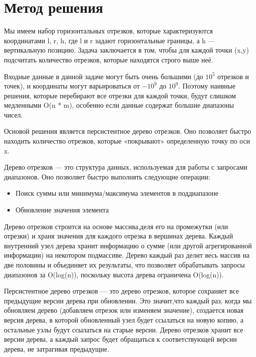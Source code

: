 \documentclass[12pt]{article}
\begin{document}
\newpage
\section*{Метод решения}

Мы имеем набор горизонтальных отрезков, которые характеризуются координатами 
l, r, h, где l и r задают горизонтальные границы, а h — вертикальную позицию. Задача заключается в том, чтобы для каждой точки (x,y) подсчитать количество отрезков, которые находятся строго выше неё.

Входные данные в данной задаче могут быть очень большими (до $10^5$ отрезков и точек), и координаты могут варьироваться от $-10^9$ до $10^9$. Поэтому наивные решения, которые перебирают все отрезки для каждой точки, будут слишком медленными O(n * m), особенно если данные содержат большие диапазоны чисел.

Основой решения является персистентное дерево отрезков. Оно позволяет быстро находить количество отрезков, которые «покрывают» определенную точку по оси x. 

Дерево отрезков — это структура данных, используемая для работы с запросами диапазонов. Оно позволяет быстро выполнять следующие операции:

\begin{itemize}
    \item Поиск суммы или минимума/максимума элементов в поддиапазоне
    \item Обновление значения элемента
\end{itemize}

Дерево отрезков строится на основе массива,деля его на промежутки (или отрезки) и храня значения для каждого отрезка в вершинах дерева. Каждый внутренний узел дерева хранит информацию о сумме (или другой агрегированной информации) на некотором подмассиве. Дерево каждый раз делит весь массив на две половины и объединяет их результаты, что позволяет обрабатывать запросы диапазонов за O(log(n)), поскольку высота дерева ограничена O(log(n)).

Персистентное дерево отрезков — это дерево отрезков, которое сохраняет все предыдущие версии дерева при обновлении. Это значит,что каждый раз, когда мы обновляем дерево (добавляем отрезок или изменяем значение), создается новая версия дерева, в которой обновленный узел будет ссылаться на новую копию, а остальные узлы будут ссылаться на старые версии. Дерево отрезков хранит все версии дерева, а каждый запрос будет обращаться к соответствующей версии дерева, не затрагивая предыдущие.
\end{document}
